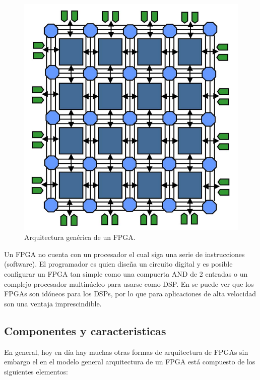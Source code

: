 \documentclass[twoside,spanish,ESP,MSc]{plantillaLabUPV}
\theoremstyle{definition}
\newcommand{\f}{FPGA }
\newcommand{\fs}{FPGAs }
\begin{document}
\begin{figure}[!tbh]
\centering
\includegraphics[scale=0.3]{ima/arqf.png}
\caption{Arquitectura genérica de un FPGA.%
\label{arqf}}
\end{figure}

Un \f no cuenta con un procesador el cual siga una serie de instrucciones (software). El programador es quien diseña un circuito digital y es posible configurar un \f tan simple como una compuerta AND de 2 entradas o un complejo procesador multinúcleo para usarse como DSP. En \cite{bajaj} se puede ver que los \fs son idóneos para los DSPs, por lo que para aplicaciones de alta velocidad son una ventaja imprescindible.


\subsection{Componentes y caracteristicas}

En general, hoy en día hay muchas otras formas de arquitectura de FPGAs sin embargo el en el modelo general arquitectura de un \f está compuesto de los siguientes elementos:

\end{document}
